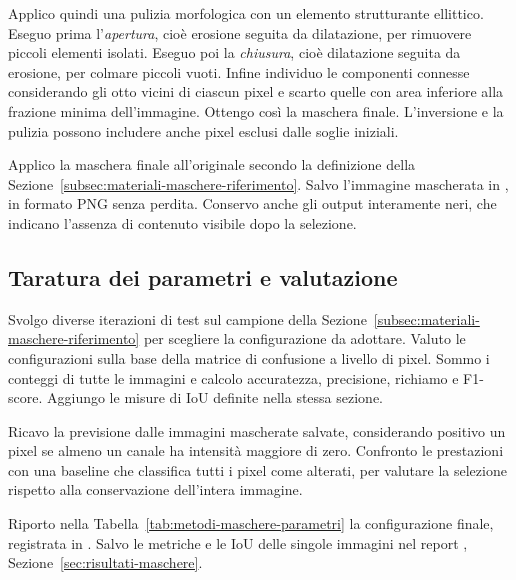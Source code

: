 Applico quindi una pulizia morfologica con un elemento strutturante ellittico. Eseguo prima l'\emph{apertura}, cioè erosione seguita da dilatazione, per rimuovere piccoli elementi isolati. Eseguo poi la \emph{chiusura}, cioè dilatazione seguita da erosione, per colmare piccoli vuoti. Infine individuo le componenti connesse considerando gli otto vicini di ciascun pixel e scarto quelle con area inferiore alla frazione minima dell'immagine. Ottengo così la maschera finale. L'inversione e la pulizia possono includere anche pixel esclusi dalle soglie iniziali.

Applico la maschera finale all'originale secondo la definizione della Sezione~\ref{subsec:materiali-maschere-riferimento}. Salvo l'immagine mascherata in , in formato PNG senza perdita. Conservo anche gli output interamente neri, che indicano l'assenza di contenuto visibile dopo la selezione.

\subsection{Taratura dei parametri e valutazione}
\label{subsec:metodi-maschere-taratura}

Svolgo diverse iterazioni di test sul campione della Sezione~\ref{subsec:materiali-maschere-riferimento} per scegliere la configurazione da adottare. Valuto le configurazioni sulla base della matrice di confusione a livello di pixel. Sommo i conteggi di tutte le immagini e calcolo accuratezza, precisione, richiamo e F1-score. Aggiungo le misure di IoU definite nella stessa sezione.

Ricavo la previsione dalle immagini mascherate salvate, considerando positivo un pixel se almeno un canale ha intensità maggiore di zero. Confronto le prestazioni con una baseline che classifica tutti i pixel come alterati, per valutare la selezione rispetto alla conservazione dell'intera immagine.

Riporto nella Tabella~\ref{tab:metodi-maschere-parametri} la configurazione finale, registrata in . Salvo le metriche e le IoU delle singole immagini nel report , Sezione~\ref{sec:risultati-maschere}.

